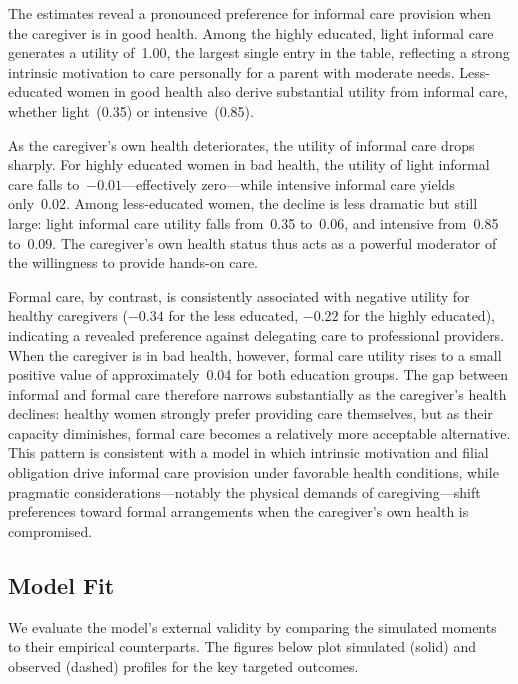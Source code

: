 The estimates reveal a pronounced preference for informal care
provision when the caregiver is in good health.  Among the highly
educated, light informal care generates a utility of~1.00, the
largest single entry in the table, reflecting a strong intrinsic
motivation to care personally for a parent with moderate needs.
Less-educated women in good health also derive substantial utility
from informal care, whether light~(0.35) or intensive~(0.85).

As the caregiver's own health deteriorates, the utility of informal
care drops sharply.  For highly educated women in bad health, the
utility of light informal care falls to~$-0.01$---effectively
zero---while intensive informal care yields only~0.02.  Among
less-educated women, the decline is less dramatic but still large:
light informal care utility falls from~0.35 to~0.06, and intensive
from~0.85 to~0.09.  The caregiver's own health status thus acts as a
powerful moderator of the willingness to provide hands-on care.

Formal care, by contrast, is consistently associated with negative
utility for healthy caregivers ($-0.34$ for the less educated, $-0.22$
for the highly educated), indicating a revealed preference against
delegating care to professional providers.  When the caregiver is in
bad health, however, formal care utility rises to a small positive
value of approximately~0.04 for both education groups.  The gap
between informal and formal care therefore narrows substantially as
the caregiver's health declines: healthy women strongly prefer
providing care themselves, but as their capacity diminishes, formal
care becomes a relatively more acceptable alternative.  This pattern
is consistent with a model in which intrinsic motivation and filial
obligation drive informal care provision under favorable health
conditions, while pragmatic considerations---notably the physical
demands of caregiving---shift preferences toward formal arrangements
when the caregiver's own health is compromised.




\subsection{Model Fit}
\label{sec:results_model_fit}

We evaluate the model's external validity by comparing the simulated
moments to their empirical counterparts.  The figures below plot
simulated (solid) and observed (dashed) profiles for the key targeted
outcomes.


